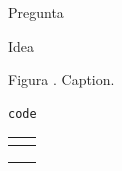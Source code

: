 \documentclass[12pt]{report}
\theoremstyle{largebreak}
\newcounter{figcount}
\begin{document}
\begin{preg}
    Pregunta
\end{preg}

\begin{idea}
    Idea
\end{idea}

\begin{minipage}{\textwidth}
    \begin{center}
        Figura \thefigcount. Caption.
    \end{center}
\end{minipage}


\begin{lstlisting}[caption={caption},label=DescriptiveLabel]
    code
\end{lstlisting}

\begin{longtable}{c c}
\toprule
\textbf{ } & \textbf{ } \\
\midrule
\endfirsthead


\midrule
\textbf{ } & \textbf{ } \\
\midrule
\endhead


\bottomrule
\endfoot


 & \\ 
\hline 
 & \\ 
\end{longtable}
\end{document}
